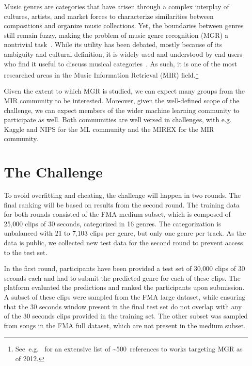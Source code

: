 \documentclass[sigconf]{acmart}
\begin{document}
Music genres are categories that have arisen through a complex interplay of cultures, artists, and market forces to characterize similarities between compositions and organize music collections. Yet, the boundaries between genres still remain fuzzy, making the problem of music genre recognition (MGR) a nontrivial task~\cite{mir_review_genre}. While its utility has been debated, mostly because of its ambiguity and cultural definition, it is widely used and understood by end-users who find it useful to discuss musical categories~\cite{mgr_why}. As such, it is one of the most researched areas in the Music Information Retrieval (MIR) field.\footnote{See e.g.\ \cite{mgr_eval_1} for an extensive list of \textasciitilde500 references to works targeting MGR as of 2012.}

Given the extent to which MGR is studied, we can expect many groups from the MIR community to be interested. Moreover, given the well-defined scope of the challenge, we can expect members of the wider machine learning community to participate as well. Both communities are well versed in challenges, with e.g. Kaggle and NIPS for the ML community and the MIREX for the MIR community.

\section{The Challenge}

To avoid overfitting and cheating, the challenge will happen in two rounds. The final ranking will be based on results from the second round.
The training data for both rounds consisted of the FMA medium subset, which is composed of 25,000 clips of 30 seconds, categorized in 16 genres. The categorization is unbalanced with 21 to 7,103 clips per genre, but only one genre per track. As the data is public, we collected new test data for the second round to prevent access to the test set.

In the first round, participants have been provided a test set of 30,000 clips of 30 seconds each and had to submit the predicted genre for each of these clips. The platform evaluated the predictions and ranked the participants upon submission. A subset of these clips were sampled from the FMA large dataset, while ensuring that the 30 seconds window present in the final test set do not overlap with any of the 30 seconds clips provided in the training set. The other subset was sampled from songs in the FMA full dataset, which are not present in the medium subset.
\end{document}
